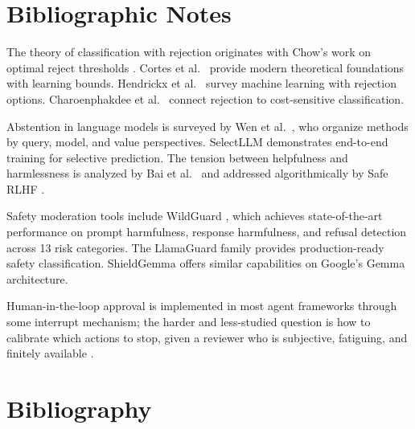 \documentclass[11pt]{book}
\begin{document}
\section*{Bibliographic Notes}

The theory of classification with rejection originates with Chow's work on optimal reject thresholds \cite{chow1970optimum}. Cortes et al.\ \cite{cortes2016learning} provide modern theoretical foundations with learning bounds. Hendrickx et al.\ \cite{hendrickx2024survey} survey machine learning with rejection options. Charoenphakdee et al.\ \cite{charoenphakdee2021rejection} connect rejection to cost-sensitive classification.

Abstention in language models is surveyed by Wen et al.\ \cite{wen2024abstention}, who organize methods by query, model, and value perspectives. SelectLLM \cite{yoshikawa2025selectllm} demonstrates end-to-end training for selective prediction. The tension between helpfulness and harmlessness is analyzed by Bai et al.\ \cite{bai2022training} and addressed algorithmically by Safe RLHF \cite{dai2024safe}.

Safety moderation tools include WildGuard \cite{han2024wildguard}, which achieves state-of-the-art performance on prompt harmfulness, response harmfulness, and refusal detection across 13 risk categories. The LlamaGuard family provides production-ready safety classification. ShieldGemma \cite{zeng2024shieldgemma} offers similar capabilities on Google's Gemma architecture.

Human-in-the-loop approval is implemented in most agent frameworks through some interrupt mechanism; the harder and less-studied question is how to calibrate which actions to stop, given a reviewer who is subjective, fatiguing, and finitely available \cite{oversightcap2026}.

\section*{Bibliography}
\end{document}
